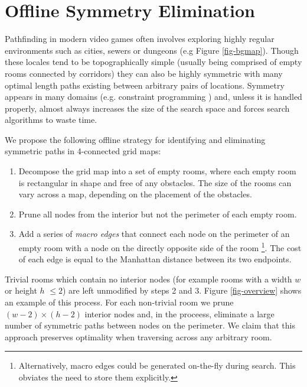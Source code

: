 \section{Offline Symmetry Elimination}
\label{algorithm}
Pathfinding in modern video games often involves exploring highly regular 
environments such as cities, sewers or dungeons (e.g Figure \ref{fig-bgmap}).
Though these locales tend to be topographically simple (usually being comprised
of empty rooms connected by corridors) they can also be highly symmetric 
with many optimal length paths existing between arbitrary pairs of locations.
Symmetry appears in many domains (e.g. constraint programming \cite{walsh07})
and, unless it is handled properly, almost always increases the size of the search space
and forces search algorithms to waste time.
\par
We propose the following offline strategy for identifying and eliminating symmetric paths in 
4-connected grid maps:
\begin{enumerate}
\item{Decompose the grid map into a set of empty rooms, where each empty room is 
rectangular in shape and free of any obstacles. 
The size of the rooms can vary across a map, depending
on the placement of the obstacles.}
\item{Prune all nodes from the interior but not the perimeter of each empty
room.}
\item{Add a series of \emph{macro edges} that connect each node on the perimeter of an empty room
with a node on the directly opposite side of the room 
\footnote{Alternatively, macro edges could be generated on-the-fly during search. 
This obviates the need to store them explicitly.}.
The cost of each edge is equal to the Manhattan distance between its two endpoints.
}
\end{enumerate}
Trivial rooms which contain no interior nodes (for example rooms with a width $w$ or height $h$ 
$\leq 2$) are left unmodified by steps 2 and 3.
Figure \ref{fig-overview} shows an example of this process.
For each non-trivial room we prune $(w-2)\times(h-2)$ interior
nodes and, in the proceess, eliminate a large number of symmetric paths between 
nodes on the perimeter.
We claim that this approach preserves optimality when traversing across any arbitrary room.

